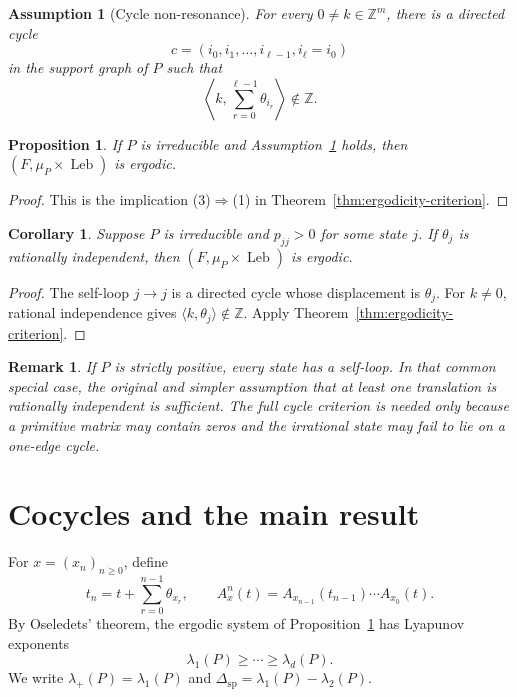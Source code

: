 \documentclass[11pt,a4paper]{amsart}
\newtheorem{proposition}[theorem]{Proposition}
\newtheorem{corollary}[theorem]{Corollary}
\newtheorem{remark}[theorem]{Remark}
\newtheorem{assumption}[theorem]{Assumption}
\newcommand{\Z}{\mathbb Z}
\newcommand{\Leb}{\operatorname{Leb}}
\newcommand{\gap}{\Delta_{\mathrm{sp}}}
\begin{document}
\begin{assumption}[Cycle non-resonance]\label{ass:cycle}
For every \(0\ne k\in\Z^m\), there is a directed cycle
\[
 c=(i_0,i_1,\dots,i_{\ell-1},i_\ell=i_0)
\]
in the support graph of \(P\) such that
\[
 \left\langle k,\sum_{r=0}^{\ell-1}\theta_{i_r}\right\rangle
 \notin\Z.
\]
\end{assumption}

\begin{proposition}\label{prop:base-ergodic}
If \(P\) is irreducible and Assumption~\ref{ass:cycle} holds, then
\((F,\mu_P\times\Leb)\) is ergodic.
\end{proposition}

\begin{proof}
This is the implication (3)\(\Rightarrow\)(1) in
Theorem~\ref{thm:ergodicity-criterion}.
\end{proof}

\begin{corollary}\label{cor:self-loop}
Suppose \(P\) is irreducible and \(p_{jj}>0\) for some state \(j\).
If \(\theta_j\) is rationally independent, then
\((F,\mu_P\times\Leb)\) is ergodic.
\end{corollary}

\begin{proof}
The self-loop \(j\to j\) is a directed cycle whose displacement is
\(\theta_j\).  For \(k\ne0\), rational independence gives
\(\langle k,\theta_j\rangle\notin\Z\).  Apply
Theorem~\ref{thm:ergodicity-criterion}.
\end{proof}

\begin{remark}
If \(P\) is strictly positive, every state has a self-loop.  In that
common special case, the original and simpler assumption that at least
one translation is rationally independent is sufficient.  The full
cycle criterion is needed only because a primitive matrix may contain
zeros and the irrational state may fail to lie on a one-edge cycle.
\end{remark}

\section{Cocycles and the main result}
For \(x=(x_n)_{n\ge0}\), define
\[
 t_n=t+\sum_{r=0}^{n-1}\theta_{x_r},\qquad
 A_x^n(t)=A_{x_{n-1}}(t_{n-1})\cdots A_{x_0}(t).
\]
By Oseledets' theorem, the ergodic system of
Proposition~\ref{prop:base-ergodic} has Lyapunov exponents
\[
 \lambda_1(P)\ge\cdots\ge\lambda_d(P).
\]
We write \(\lambda_+(P)=\lambda_1(P)\) and
\(\gap=\lambda_1(P)-\lambda_2(P)\).
\end{document}
